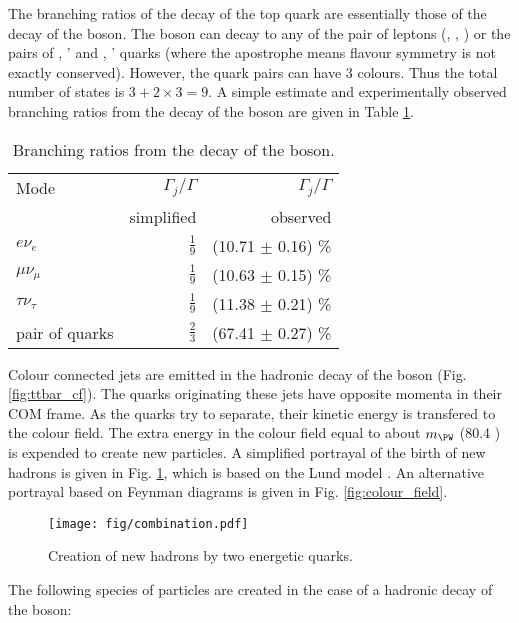 The branching ratios of the decay of the top quark are essentially those of the decay of the \PW boson. The \PW boson can decay to any of the pair of leptons (\Pe\Pgne, \Pgm\Pgngm, \Pgt\Pgngt) or the pairs of \cPqu, \cPqd' and \cPqc, \cPqs' quarks (where the apostrophe means flavour symmetry is not exactly conserved). However, the quark pairs can have 3 colours. Thus the total number of states is $3+2\times3=9$. A simple estimate and experimentally observed branching ratios from the decay of the \PW boson are given in Table \ref{tab:W_br}.

\begin{table}[h!]
  \centering
  \caption{Branching ratios from the decay of the \PW boson.}
  \label{tab:W_br}
  \begin{tabular}{l r r}
    Mode                  & $\Gamma_{j}/\Gamma$ & $\Gamma_{j}/\Gamma$\\
                          & simplified          & observed \cite{Patrignani:2016xqp}\\
    \hline
    $e\nu_{e}$            & $\frac{1}{9}$       & (10.71 $\pm$ 0.16) \%\\
    $\mu\nu_{\mu}$        & $\frac{1}{9}$       & (10.63 $\pm$ 0.15) \%\\
    $\tau\nu_{\tau}$      & $\frac{1}{9}$       & (11.38 $\pm$ 0.21) \%\\
    pair of quarks        & $\frac{2}{3}$       & (67.41 $\pm$ 0.27) \%
  \end{tabular}
\end{table}

Colour connected jets are emitted in the hadronic decay of the \PW boson (Fig. \ref{fig:ttbar_cf}). The quarks originating these jets have opposite momenta in their COM frame. As the quarks try to separate, their kinetic energy is transfered to the colour field. The extra energy in the colour field equal to about $m_{\PW}$ (80.4 \GeV) is expended to create new particles. A simplified portrayal of the birth of new hadrons is given in Fig. \ref{fig:combination}, which is based on the Lund model \cite{Andersson:1983ia}. An alternative portrayal based on Feynman diagrams is given in Fig. \ref{fig:colour_field}.

\begin{figure}[htp]
  \centering
  \texttt{[image: fig/combination.pdf]}
  \caption{Creation of new hadrons by two energetic quarks.}
  \label{fig:combination}
\end{figure}


The following species of particles are created in the case of a hadronic decay of the \PW boson:

